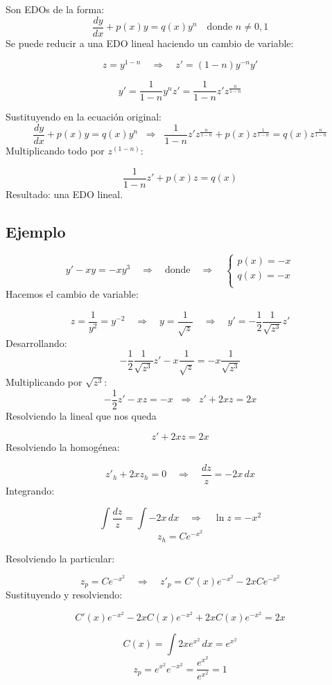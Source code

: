 \documentclass[a4paper,12pt]{article}
\begin{document}
\medskip
\noindent
Son EDOs de la forma:
\[
\frac{dy}{dx} + p(x)y = q(x) y^n \quad \text{donde } n \neq 0,1
\]
Se puede reducir a una EDO lineal haciendo un cambio de variable:

\[
z = y^{1-n} \quad \Rightarrow \quad z' = (1 - n) y^{-n} y'
\]

\[
y' = \frac{1}{1 - n} y^n z' = \frac{1}{1-n} z' z^{\frac{n}{1-n}}
\]

\newpage
\noindent
Sustituyendo en la ecuación original:
\[
\frac{dy}{dx} + p(x)y = q(x) y^n
\;\;\Rightarrow\;\;
\frac{1}{1 - n} z'z^{\frac{n}{1-n}} + p(x) z^{\frac{1}{1-n}}  = q(x)z^{\frac{n}{1-n}}
\]
Multiplicando todo por $z^{(1 - n)}$:

\[
\frac{1}{1-n}z' + p(x) z = q(x)
\]
Resultado: una EDO lineal.

\subsection*{Ejemplo}
\vspace{-1.5em}
\[
y' - xy = -x y^3 
\quad\Rightarrow \quad
\text{donde}
\quad\Rightarrow\quad
\begin{cases}
p(x) = -x \\[4pt]
q(x) = -x \\
\end{cases}
\]
Hacemos el cambio de variable:

\[
z = \frac{1}{y^2} = y^{-2}
\quad \Rightarrow \quad
y = \frac{1}{\sqrt{z}}
\quad \Rightarrow \quad
y' = -\frac{1}{2} \frac{1}{\sqrt{z^3}} z'
\]
Desarrollando:
\[
-\frac{1}{2} \frac{1}{\sqrt{z^3}} z' - x \frac{1}{\sqrt{z}} = -x \frac{1}{\sqrt{z^3}}
\]
Multiplicando por $\sqrt{z^3}$:
\[
-\frac{1}{2} z' - xz = -x
\;\;\Rightarrow\;\;
z' + 2xz = 2x
\]
Resolviendo la lineal que nos queda

\[
z' + 2xz = 2x
\]
Resolviendo la homogénea:

\[
z'_h + 2xz_h = 0 \quad \Rightarrow \quad \frac{dz}{z} = -2x\, dx
\]
Integrando:

\[
\int \frac{dz}{z} = \int -2x\, dx
\quad\Rightarrow\quad
\ln z = -x^2
\]
\[
z_h = C e^{-x^2}
\]

\newpage
\noindent
Resolviendo la particular:

\[
z_p = C e^{-x^2} \quad \Rightarrow \quad z'_p = C'(x) e^{-x^2} - 2x C e^{-x^2}
\]
Sustituyendo y resolviendo:

\[
C'(x)e^{-x^2} - 2xC(x)e^{-x^2} + 2xC(x)e^{-x^2} = 2x
\]

\[
C(x) = \int 2x e^{x^2}\, dx = e^{x^2} 
\]
\[
z_p = e^{x^2} e^{-x^2} = \frac{e^{x^2}}{e^{x^2}} = 1
\]
\end{document}
